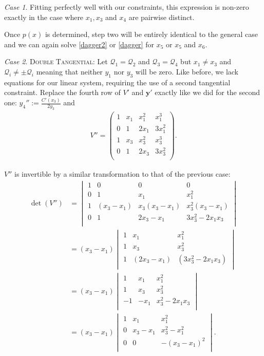 \documentclass[english,11pt,a4paper]{article}
\theoremstyle{definition}
\theoremstyle{remark}
\theoremstyle{case}
\newtheorem{case}{Case}
\newcommand{\q}{\mathcal{Q}}
\begin{document}
\begin{case}
	Fitting perfectly well with our constraints, this expression is non-zero exactly in the case where $x_1, x_3$ and $x_4$ are pairwise distinct.

	Once $p(x)$ is determined, step two will be entirely identical to the general case and we can again solve \eqref{dagger2} or \eqref{dagger} for $x_5$ or $x_5$ and $x_6$.

\end{case}

\begin{case}
	{\scshape Double Tangential:} Let $\q_1 = \q_2$ and $\q_3 = \q_4$ but $x_1 \neq x_3$ and $\q_i \neq \pm \q_i$ meaning that neither $y_1$ nor $y_3$ will be zero. Like before, we lack equations for our linear system, requiring the use of a second tangential constraint. Replace the fourth row of $V'$ and $\mathbf{y'}$ exactly like we did for the second one: $y_4'':=\frac{C'(x_3)}{2 y_3}$ and
	\begin{align*}V''=
		\begin{pmatrix}
			1 & x_1 & x_1^2 & x_1^3\\
			0 & 1 & 2 x_1 & 3 x_1^2\\
			1 & x_3 & x_3^2 & x_3^3\\
			0 & 1 & 2 x_3 & 3 x_3^2\\
		\end{pmatrix}.
	\end{align*}

	$V''$ is invertible by a similar transformation to that of the previous case:
		\begin{align*}\det (V'') &= 
		\begin{vmatrix}
			1 & 0 & 0 & 0\\
			0 & 1 & x_1 & x_1^2\\
			1 & (x_3-x_1) & x_3(x_3-x_1) & x_3^2(x_3-x_1)\\
			0 & 1 & 2x_3 - x_1 & 3x_3^2-2x_1x_3\\
		\end{vmatrix}
		\\
		&= (x_3-x_1)
		\begin{vmatrix}
			1 & x_1 & x_1^2\\
			1 & x_3 & x_3^2\\
			1 & (2x_3 - x_1) & (3x_3^2-2x_1x_3)\\
		\end{vmatrix}
		\\
		&= (x_3-x_1)
		\begin{vmatrix}
			1 & x_1 & x_1^2\\
			1 & x_3 & x_3^2\\
			-1 & - x_1 & x_3^2-2x_1 x_3\\
		\end{vmatrix}
		\\		
		&= (x_3-x_1)
		\begin{vmatrix}
			1 & x_1 & x_1^2\\
			0 & x_3-x_1 & x_3^2-x_1^2\\
			0 & 0 & -(x_3-x_1)^2\\
		\end{vmatrix}.
	\end{align*}


\end{case}
\end{document}
